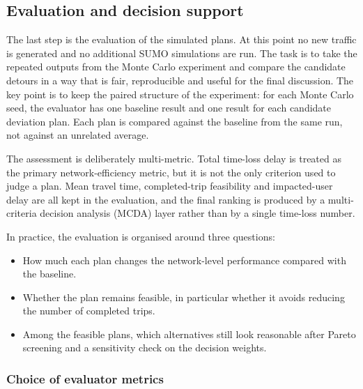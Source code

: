\subsection{Evaluation and decision support}
\label{subsec:evaluator}

The last step is the evaluation of the simulated plans. At this point no new
traffic is generated and no additional SUMO simulations are run. The task is
to take the repeated outputs from the Monte Carlo experiment and compare the
candidate detours in a way that is fair, reproducible and useful for the
final discussion. The key point is to keep the paired structure of the
experiment: for each Monte Carlo seed, the evaluator has one baseline result
and one result for each candidate deviation plan. Each plan is compared
against the baseline from the same run, not against an unrelated average.

The assessment is deliberately multi-metric. Total time-loss delay is treated
as the primary network-efficiency metric, but it is not the only criterion
used to judge a plan. Mean travel time, completed-trip feasibility and
impacted-user delay are all kept in the evaluation, and the final ranking is
produced by a multi-criteria decision analysis (MCDA) layer rather than by a
single time-loss number.

In practice, the evaluation is organised around three questions:
\begin{itemize}
  \item How much each plan changes the network-level performance compared with the baseline.
  \item Whether the plan remains feasible, in particular whether it avoids reducing the number of completed trips.
  \item Among the feasible plans, which alternatives still look reasonable after Pareto screening and a sensitivity check on the decision weights.
\end{itemize}

\subsubsection{Choice of evaluator metrics}
\label{sssec:evaluator_metric_choices}

